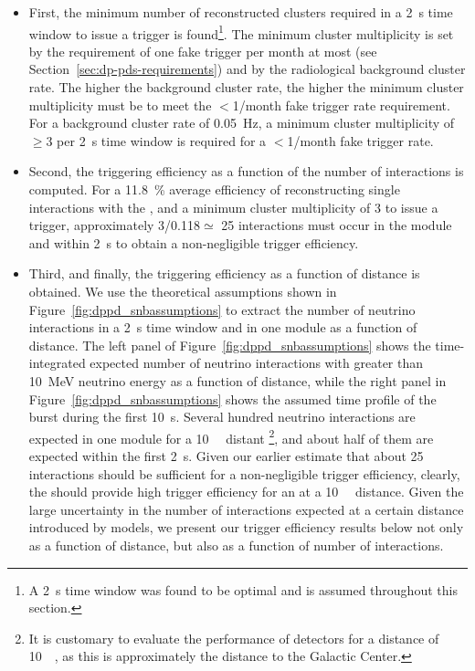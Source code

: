 \begin{itemize}
\item First, the minimum number of reconstructed clusters required in a \SI{2}{\s} time window  to issue a trigger is found\footnote{A \SI{2}{\s} time window was found to be optimal and is assumed throughout this section.}. The minimum cluster multiplicity is set by the requirement of one fake trigger per month at most (see Section~\ref{sec:dp-pds-requirements}) and by the radiological background cluster rate. The higher the background cluster rate, the higher the minimum cluster multiplicity must be to meet the $<$\num{1}/month fake trigger rate requirement. For a background cluster rate of \SI{0.05}{\Hz}, a minimum cluster multiplicity of $\ge$\num{3} per \SI{2}{\s} time window is required for a $<$\num{1}/month fake trigger rate.
%
\item Second, the  triggering efficiency as a function of the number of  interactions is computed. For a \SI{11.8}{\%} average efficiency of reconstructing single  \nue interactions with the , and a minimum cluster multiplicity of \num{3} to issue a trigger, approximately \num{3}/\num{0.118}$\simeq$ \num{25} interactions must occur in the  module and within \SI{2}{\s} to obtain a non-negligible trigger efficiency. 
%
\item Third, and finally, the  triggering efficiency as a function of  distance is obtained. We use the theoretical assumptions shown in Figure~\ref{fig:dppd_snbassumptions} to extract the number of  neutrino interactions in a \SI{2}{\s} time window and in one   module as a function of  distance. The left panel of Figure~\ref{fig:dppd_snbassumptions} shows the time-integrated expected number of  neutrino interactions with greater than \SI{10}{MeV} neutrino energy as a function of distance, while the right panel in Figure~\ref{fig:dppd_snbassumptions} shows the assumed time profile of the burst during the first \SI{10}{\s}. Several hundred  neutrino interactions are expected in one   module for a \SI{10}{\kilo\parsec} distant \footnote{It is customary to evaluate the performance of  detectors for a  distance of \SI{10}{\kilo\parsec}, as this is approximately the distance to the Galactic Center.}, and about half of them are expected within the first \SI{2}{\s}. Given our earlier estimate that about \num{25} interactions should be sufficient for a non-negligible trigger efficiency, clearly, the  should provide high  trigger efficiency for an  at a \SI{10}{\kilo\parsec} distance. Given the large uncertainty in the number of interactions expected at a certain  distance introduced by  models, we present our trigger efficiency results below not only as a function of  distance, but also as a function of number of  interactions. 
\end{itemize}

